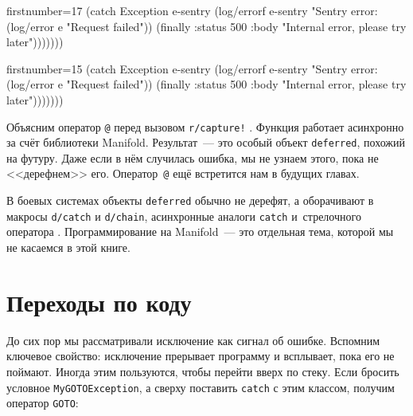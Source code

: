 \wavetop

\ifx\devicetype\mobile

\begin{english}
  \begin{clojure/lines*}{firstnumber=17}
(catch Exception e-sentry
  (log/errorf e-sentry
    "Sentry error: %
  (log/error e "Request failed"))
(finally
  {:status 500
   :body  "Internal error, please try
   later"})))))))
  \end{clojure/lines*}
\end{english}

\else

\begin{english}
  \begin{clojure/lines*}{firstnumber=15}
            (catch Exception e-sentry
              (log/errorf e-sentry "Sentry error: %
              (log/error e "Request failed"))
            (finally
              {:status 500
               :body "Internal error, please try later"})))))))
  \end{clojure/lines*}
\end{english}

\fi


\mnoindent
Объясним оператор \verb|@| перед вызовом \verb|r/capture!| \ifx\devicetype\mobile{}\else{}\fi. Функция
работает асинхронно за счёт библиотеки Manifold. Результат~--- это особый
объект \verb|deferred|, похожий на футуру. Даже если в нём случилась ошибка, мы
не узнаем этого, пока не <<дерефнем>> его. Оператор~\verb|@| ещё встретится нам
в будущих главах.

В боевых системах объекты \verb|deferred| обычно не дерефят, а оборачивают в
макросы \verb|d/catch| и \verb|d/chain|, асинхронные аналоги \verb|catch|
и~стрелочного оператора \arr{}. Программирование на Manifold~--- это
отдельная тема, которой мы не касаемся в этой книге.

\section{Переходы по коду}


До сих пор мы рассматривали исключение как сигнал об ошибке. Вспомним ключевое
свойство: исключение прерывает программу и всплывает, пока его не
поймают. Иногда этим пользуются, чтобы перейти вверх по стеку. Если бросить
условное \verb|MyGOTOException|, а сверху поставить \verb|catch| с этим
классом, получим оператор \verb|GOTO|:

